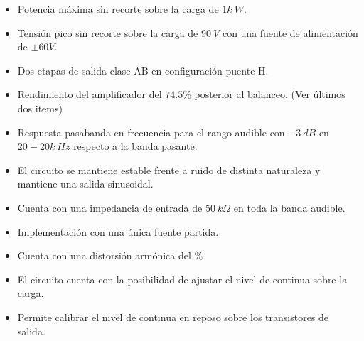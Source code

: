 \begin{itemize}
\item Potencia máxima sin recorte sobre la carga de $1k \ W$.
\item Tensión pico sin recorte sobre la carga de $90 \ V$ con una fuente de alimentación de $\pm 60V$.
\item Dos etapas de salida clase AB en configuración puente H.
\item Rendimiento del amplificador del $74.5\%$ posterior al balanceo. (Ver últimos dos items)
\item Respuesta pasabanda en frecuencia para el rango audible con $-3 \ dB$ en $20-20k \ Hz$ respecto a la banda pasante.
\item El circuito se mantiene estable frente a ruido de distinta naturaleza y mantiene una salida sinusoidal.
\item Cuenta con una impedancia de entrada de $50 \ k\Omega$ en toda la banda audible.
\item Implementación con una única fuente partida.
\item Cuenta con una distorsión armónica del $\%$
\item El circuito cuenta con la posibilidad de ajustar el nivel de continua sobre la carga.
\item Permite calibrar el nivel de continua en reposo sobre los transistores de salida.

\end{itemize}

